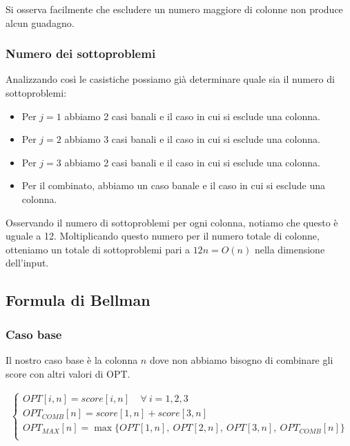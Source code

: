 Si osserva facilmente che escludere un numero maggiore di colonne non produce alcun guadagno.

\subsubsection*{Numero dei sottoproblemi}

Analizzando così le casistiche possiamo già determinare quale sia il numero di sottoproblemi:

\begin{itemize}
    \item Per $j = 1$ abbiamo 2 casi banali e il caso in cui si esclude una colonna.
    \item Per $j = 2$ abbiamo 3 casi banali e il caso in cui si esclude una colonna.
    \item Per $j = 3$ abbiamo 2 casi banali e il caso in cui si esclude una colonna.
    \item Per il combinato, abbiamo un caso banale e il caso in cui si esclude una colonna.
\end{itemize}

Osservando il numero di sottoproblemi per ogni colonna, notiamo che questo è uguale a 12. 
Moltiplicando questo numero per il numero totale di colonne, otteniamo un totale di sottoproblemi pari a $12n = O(n)$ nella dimensione dell'input. 

\subsection{Formula di Bellman}

\subsubsection*{Caso base}

Il nostro caso base è la colonna $n$ dove non abbiamo bisogno di combinare gli score con altri valori di OPT.

\begin{align*}
    \begin{cases}
        OPT[i, n] = score[i, n] \ \ \ \ \ \forall\ i = 1, 2, 3 \\
        OPT_{COMB}[n] = score[1,n] + score[3,n] \\
        OPT_{MAX}[n] = \max\{OPT[1,n],\ OPT[2,n],\ OPT[3,n],\ OPT_{COMB}[n]\} \\
    \end{cases}
\end{align*}

